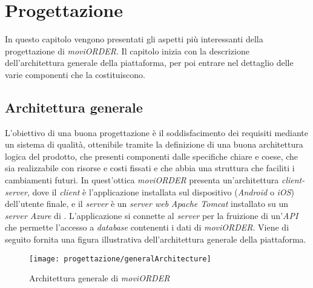
\chapter{Progettazione}
\label{cap:progettazione-codifica}

In questo capitolo vengono presentati gli aspetti più interessanti della progettazione di \textit{moviORDER}. Il capitolo inizia con la descrizione dell'architettura generale della piattaforma, per poi entrare nel dettaglio delle varie componenti che la costituiscono.

\section{Architettura generale}

L'obiettivo di una buona progettazione è il soddisfacimento dei requisiti mediante un sistema di qualità, ottenibile tramite la definizione di una buona architettura logica del prodotto, che presenti componenti dalle specifiche chiare e coese, che sia realizzabile con risorse e costi fissati e che abbia una struttura che faciliti i cambiamenti futuri. In quest'ottica \textit{moviORDER} presenta un'architettura \textit{client-server}, dove il \textit{client} è l'applicazione installata sul dispositivo (\textit{Android} o \textit{iOS}) dell'utente finale, e il \textit{server} è un \textit{server web} \textit{Apache Tomcat} installato su un \textit{server Azure} di \visione{}. L'applicazione si connette al \textit{server} per la fruizione di un'\textit{API} che permette l'accesso a \textit{database} contenenti i dati di \textit{moviORDER}. Viene di seguito fornita una figura illustrativa dell'architettura generale della piattaforma.

\newpage

\begin{figure}[!h] 
    \centering 
    \texttt{[image: progettazione/generalArchitecture]} 
    \caption{Architettura generale di \textit{moviORDER}}
\end{figure}

